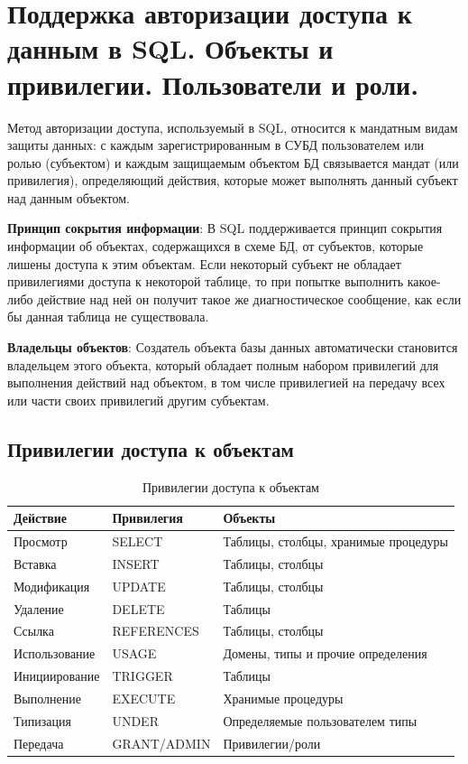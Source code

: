 \documentclass[a4paper,12pt]{article}
\begin{document}
\section{Поддержка авторизации доступа к данным в SQL. Объекты и привилегии. Пользователи и роли.}

Метод авторизации доступа, используемый в SQL, относится к мандатным видам защиты данных: с каждым зарегистрированным в СУБД пользователем или ролью (субъектом) и каждым защищаемым объектом БД связывается мандат (или привилегия), определяющий действия, которые может выполнять данный субъект над данным объектом.

\textbf{Принцип сокрытия информации}: В SQL поддерживается принцип сокрытия информации об объектах, содержащихся в схеме БД, от субъектов, которые лишены доступа к этим объектам. Если некоторый субъект не обладает привилегиями доступа к некоторой таблице, то при попытке выполнить какое-либо действие над ней он получит такое же диагностическое сообщение, как если бы данная таблица не существовала.

\textbf{Владельцы объектов}: Создатель объекта базы данных автоматически становится владельцем этого объекта, который обладает полным набором привилегий для выполнения действий над объектом, в том числе привилегией на передачу всех или части своих привилегий другим субъектам.

\subsection{Привилегии доступа к объектам}

\begin{table}[h!]
    \centering
    \begin{tabular}{|l|l|l|}
        \hline
        \textbf{Действие} & \textbf{Привилегия} & \textbf{Объекты} \\
        \hline
        Просмотр & SELECT & Таблицы, столбцы, хранимые процедуры \\
        \hline
        Вставка & INSERT & Таблицы, столбцы \\
        \hline
        Модификация & UPDATE & Таблицы, столбцы \\
        \hline
        Удаление & DELETE & Таблицы \\
        \hline
        Ссылка & REFERENCES & Таблицы, столбцы \\
        \hline
        Использование & USAGE & Домены, типы и прочие определения \\
        \hline
        Инициирование & TRIGGER & Таблицы \\
        \hline
        Выполнение & EXECUTE & Хранимые процедуры \\
        \hline
        Типизация & UNDER & Определяемые пользователем типы \\
        \hline
        Передача & GRANT/ADMIN & Привилегии/роли \\
        \hline
    \end{tabular}
    \caption{Привилегии доступа к объектам}
\end{table}
\end{document}
